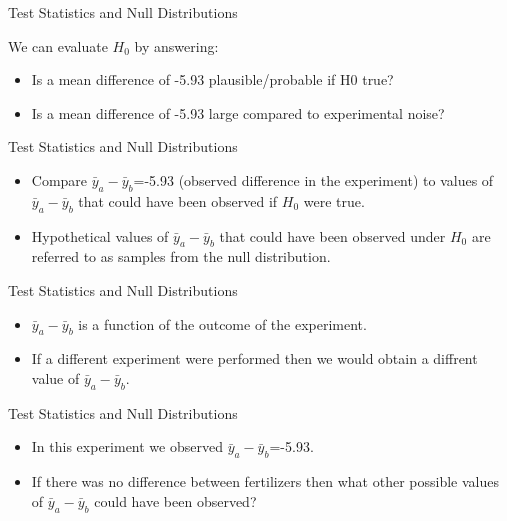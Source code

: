 \documentclass[9pt,ignorenonframetext,]{beamer}
\providecommand{\tightlist}{%
\setlength{\itemsep}{0pt}\setlength{\parskip}{0pt}}
\begin{document}
\begin{frame}{Test Statistics and Null Distributions}

We can evaluate \(H_0\) by answering:

\begin{itemize}
\item
  Is a mean difference of -5.93 plausible/probable if H0 true?
\item
  Is a mean difference of -5.93 large compared to experimental noise?
\end{itemize}

\end{frame}

\begin{frame}{Test Statistics and Null Distributions}

\begin{itemize}
\item
  Compare \({\bar y}_a-{\bar y}_b\)=-5.93 (observed difference in the
  experiment) to values of \({\bar y}_a-{\bar y}_b\) that could have
  been observed if \(H_0\) were true.
\item
  Hypothetical values of \({\bar y}_a-{\bar y}_b\) that could have been
  observed under \(H_0\) are referred to as samples from the null
  distribution.
\end{itemize}

\end{frame}

\begin{frame}{Test Statistics and Null Distributions}

\begin{itemize}
\item
  \({\bar y}_a-{\bar y}_b\) is a function of the outcome of the
  experiment.
\item
  If a different experiment were performed then we would obtain a
  diffrent value of \({\bar y}_a-{\bar y}_b\).
\end{itemize}

\end{frame}

\begin{frame}{Test Statistics and Null Distributions}

\begin{itemize}
\tightlist
\item
  In this experiment we observed \({\bar y}_a-{\bar y}_b\)=-5.93.
\item
  If there was no difference between fertilizers then what other
  possible values of \({\bar y}_a-{\bar y}_b\) could have been observed?
\end{itemize}

\end{frame}
\end{document}
